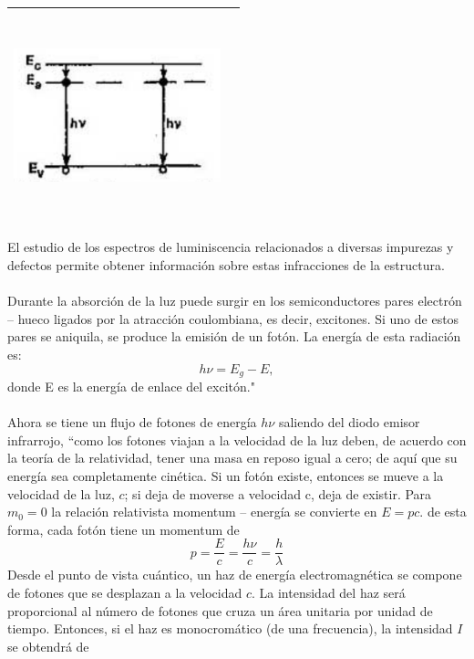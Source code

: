 \documentclass[12]{article}
\newenvironment{Figure}
{\par\medskip\noindent\minipage{\linewidth}}
{\endminipage\par\medskip}
\begin{document}
\begin{multicols}{2}
\begin{Figure}
\begin{tabular}{|l|r|}
\hline
\includegraphics[width=6cm, height=6cm]{img/transiciones.png} \\ \hline
\end{tabular}
\label{fig:g1}
\end{Figure}
El estudio de los espectros de luminiscencia relacionados a diversas impurezas y defectos permite obtener información sobre estas infracciones de la estructura. \\ \\
Durante la absorción de la luz puede surgir en los semiconductores pares electrón – hueco ligados por la atracción coulombiana, es decir, excitones. Si uno de estos pares se aniquila, se produce la emisión de un fotón. La energía de esta radiación es: 
\begin{equation}
h\nu = E_g - E,
\end{equation}
donde E es la energía de enlace del excitón." \cite{SEMICONDUCTOR} \\ \\
Ahora se tiene un flujo de fotones de energía $h\nu$ saliendo del diodo emisor infrarrojo,  ``como los fotones viajan a la velocidad de la luz deben, de acuerdo con la teoría de la relatividad, tener una masa en reposo igual a cero; de aquí que su energía sea completamente cinética. Si un fotón existe, entonces se mueve a la velocidad de la luz, $c$; si deja de moverse a velocidad c, deja de existir. Para $m_{0} = 0$ la relación relativista momentum – energía  se convierte en $E = pc$.
de esta forma, cada fotón tiene un momentum de 
\begin{equation}
p = \frac{E}{c} = \frac{h\nu}{c} = \frac{h}{\lambda}
\end{equation}
Desde el punto de vista cuántico, un haz de energía electromagnética se compone de fotones que se desplazan a la velocidad $c$. La intensidad del haz será proporcional al número de fotones que cruza un área unitaria por unidad de tiempo. Entonces, si el haz es monocromático (de una frecuencia), la intensidad $I$ se obtendrá de 

\end{multicols}
\end{document}
